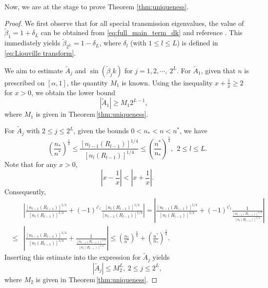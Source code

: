 \documentclass[11pt,reqno]{amsart}
\theoremstyle{definition}
\theoremstyle{remark}
\numberwithin{equation}{section}
\begin{document}
Now, we are at the stage to prove Theorem \ref{thm:uniqueness}.
\begin{proof}
We first observe that for all special transmission eigenvalues, the value of $\tilde{\beta}_1 = 1 + \delta_L$ can be obtained from \eqref{eq:full_main_term_dk} and reference \cite{CCH16}. This immediately yields $\tilde{\beta}_{2^L} = 1 - \delta_L$, where $\delta_l$ (with $1 \leq l \leq L$) is defined in \eqref{eq:Liouville transform}.	

We aim to estimate $ \tilde{A}_j $ and $ \sin(\tilde{\beta}_j k) $ for $ j=1,2,\cdots,~2^L $. For $\tilde{A}_1$, given that $n$ is prescribed on $[\alpha,1]$, the quantity $M_1$ is known. Using the inequality $x + \frac{1}{x} \geq 2$ for $x > 0$, we obtain the lower bound
\begin{equation}\label{eq:tilde_A_1}
    |\tilde{A}_1|\geq M_1 2^{L-1},\quad 
\end{equation}
where $M_1$ is given in Theorem\,\ref{thm:uniqueness}.

For $\tilde{A}_j$ with $2 \leq j \leq 2^L$, given the bounds $0 < n_* < n < n^*$, we have
\begin{equation*}
	\left(\frac{n_*}{n^*}\right)^{\frac{1}{4}} \leq \frac{\left[n_{l-1}(R_{l-1})\right]^{1/4}}{\left[n_l(R_{l-1})\right]^{1/4}}\leq 	\left(\frac{n^*}{n_*}\right)^{\frac{1}{4}},~~ 2\leq l\leq L.
\end{equation*}
Note that for any $x>0$,
\begin{equation*}
\left|x - \frac{1}{x}\right| < \left|x + \frac{1}{x}\right|.
\end{equation*}
Consequently,
\begin{eqnarray*}
&& \left|\frac{\left[n_{l-1}(R_{l-1})\right]^{1/4}}{\left[n_l(R_{l-1})\right]^{1/4}}
	+ (-1)^{i'_l} \frac{\left[n_l(R_{l-1})\right]^{1/4}}{\left[n_{l-1}(R_{l-1})\right]^{1/4}}\right|
	=\left|\frac{\left[n_{l-1}(R_{l-1})\right]^{1/4}}{\left[n_l(R_{l-1})\right]^{1/4}}
	+ (-1)^{i'_l} \frac{1}{\frac{\left[n_{l-1}(R_{l-1})\right]^{1/4}}{\left[n_l(R_{l-1})\right]^{1/4}}}\right| \nonumber\\
&\leq& \left|\frac{\left[n_{l-1}(R_{l-1})\right]^{1/4}}{\left[n_l(R_{l-1})\right]^{1/4}}+\frac{1}{\frac{\left[n_{l-1}(R_{l-1})\right]^{1/4}}{\left[n_l(R_{l-1})\right]^{1/4}}}\right|
\leq \left(\frac{n_*}{n^*}\right)^{\frac{1}{4}} +\left(\frac{n^*}{n_*}\right)^{\frac{1}{4}}.
\end{eqnarray*}
Inserting this estimate into the expression for $\tilde{A}_j$ yields
\begin{equation}\label{eq:upper bound for tilde_A_j}
   \left|\tilde{A}_j\right|\leq M_2^L,~2\leq j\leq 2^L,
\end{equation}
where $M_2$ is given in Theorem\,\ref{thm:uniqueness}.


\end{proof}
\end{document}
